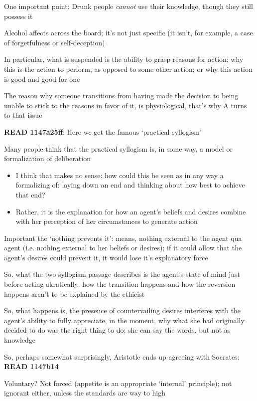 \documentclass[11pt]{article}
\begin{document}
\noindent One important point: Drunk people \emph{cannot} use their knowledge, though they still possess it
\vspace*{2mm}

\noindent Alcohol affects across the board; it's not just specific (it isn't, for example, a case of forgetfulness or self-deception)
\vspace*{2mm}

\noindent In particular, what is suspended is the ability to grasp reasons for action; why this is the action to perform, as opposed to some other action; or why this action is good and good for one
\vspace*{2mm}

\noindent The reason why someone transitions from having made the decision to being unable to stick to the reasons in favor of it, is physiological, that's why A turns to that issue
\vspace*{2mm}

\noindent\textbf{READ 1147a25ff}: Here we get the famous `practical syllogism'
\vspace*{2mm}

\noindent Many people think that the practical syllogism is, in some way, a model or formalization of deliberation

\begin{itemize}\item{I think that makes no sense: how could this be seen as in any way a formalizing of: laying down an end and thinking about how best to achieve that end?}\item{Rather, it is the explanation for how an agent's beliefs and desires combine with her perception of her circumstances to generate action}\end{itemize}

\noindent Important the `nothing prevents it': means, nothing external to the agent qua agent (i.e. nothing external to her beliefs or desires); if it could allow that the agent's desires could prevent it, it would lose it's explanatory force
\vspace*{2mm}

\noindent So, what the two syllogism passage describes is the agent's state of mind just before acting akratically: how the transition happens and how the reversion happens aren't to be explained by the ethicist
\vspace*{2mm}

\noindent So, what happens is, the presence of countervailing desires interferes with the agent's ability to fully appreciate, in the moment, why what she had originally decided to do was the right thing to do; she can say the words, but not as knowledge
\vspace*{2mm}

\noindent So, perhaps somewhat surprisingly, Aristotle ends up agreeing with Socrates: \textbf{READ 1147b14}
\vspace*{2mm}

\noindent Voluntary? Not forced (appetite is an appropriate `internal' principle); not ignorant either, unless the standards are way to high
\end{document}

